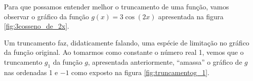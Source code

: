 Para que possamos entender melhor o truncamento de uma função, vamos observar o gráfico da função $g(x) = 3\cos(2x)$ apresentada na figura
\ref{fig:3cosseno_de_2x}. 
	\begin{figure}[h!]
		\centering
	\end{figure}
	Um truncamento faz, didaticamente falando, uma espécie de limitação no gráfico da função original.
	Ao tomarmos como constante o número real 1, vemos que o truncamento $g_1$ da função $g$, apresentada anteriormente, \enquote{amassa} o gráfico de $g$ nas ordenadas 1 e $-1$ como exposto na figura \ref{fig:truncamentog_1}.
